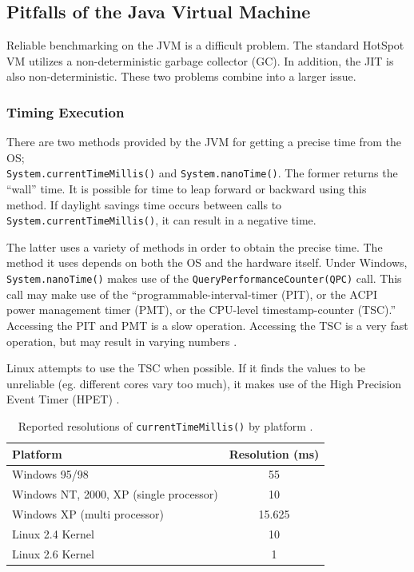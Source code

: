 \documentclass[12pt,letterpaper,oneside,notitlepage]{report}
\theoremstyle{definition}
\begin{document}
      \subsection{Pitfalls of the Java Virtual Machine}
        Reliable benchmarking on the JVM is a difficult problem.  The standard HotSpot VM utilizes a non-deterministic garbage collector (GC).  In addition, the JIT is also non-deterministic.  These two problems combine into a larger issue.
        
        \subsubsection{Timing Execution}
          There are two methods provided by the JVM for getting a precise time from the OS; \\\texttt{System.currentTimeMillis()} and \texttt{System.nanoTime()}.  The former returns the ``wall'' time.  It is possible for time to leap forward or backward using this method.  If daylight savings time occurs between calls to \texttt{System.currentTimeMillis()}, it can result in a negative time.
          
          The latter uses a variety of methods in order to obtain the precise time.  The method it uses depends on both the OS and the hardware itself.  Under Windows, \texttt{System.nanoTime()} makes use of the \texttt{QueryPerformanceCounter(QPC)} call.  This call may make use of the ``programmable-interval-timer (PIT), or the ACPI power management timer (PMT), or the CPU-level timestamp-counter (TSC).'' \cite{hotspot-timer-06}  Accessing the PIT and PMT is a slow operation.  Accessing the TSC is a very fast operation, but may result in varying numbers \cite{linux-tsc-06}.
          
          Linux attempts to use the TSC when possible.  If it finds the values to be unreliable (eg. different cores vary too much), it makes use of the High Precision Event Timer (HPET) \cite{linux-tsc-06}.
          
          \begin{table}[!ht]
            \centering
            \begin{tabular}{lc}
              \toprule
              Platform & Resolution (ms) \\
              \midrule
              Windows 95/98 & 55 \\
              Windows NT, 2000, XP (single processor) & 10 \\
              Windows XP (multi processor) & 15.625 \\
              Linux 2.4 Kernel & 10 \\
              Linux 2.6 Kernel & 1 \\
              \bottomrule
            \end{tabular}
            \caption{Reported resolutions of \texttt{currentTimeMillis()} by platform \cite{rob-java-bench-08}.}
          \end{table}
          
\end{document}
